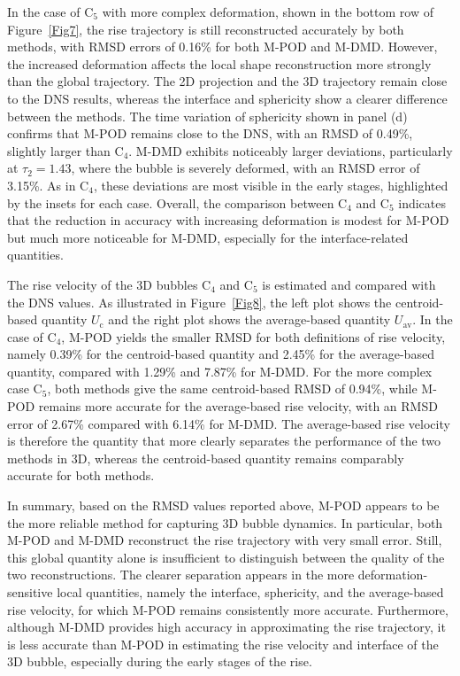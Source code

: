 \documentclass[a4paper,fleqn]{cas-sc}
\begin{document}
	In the case of C$_5$ with more complex deformation, shown in the bottom row of Figure~\ref{Fig7}, the rise trajectory is still reconstructed accurately by both methods, with RMSD errors of 0.16\% for both M-POD and M-DMD. However, the increased deformation affects the local shape reconstruction more strongly than the global trajectory. The 2D projection and the 3D trajectory remain close to the DNS results, whereas the interface and sphericity show a clearer difference between the methods. The time variation of sphericity shown in panel (d) confirms that M-POD remains close to the DNS, with an RMSD of 0.49\%, slightly larger than C$_4$. M-DMD exhibits noticeably larger deviations, particularly at $\tau_2=1.43$, where the bubble is severely deformed, with an RMSD error of 3.15\%. As in C$_4$, these deviations are most visible in the early stages, highlighted by the insets for each case. Overall, the comparison between C$_4$ and C$_5$ indicates that the reduction in accuracy with increasing deformation is modest for M-POD but much more noticeable for M-DMD, especially for the interface-related quantities.
	
	The rise velocity of the 3D bubbles C$_4$ and C$_5$ is estimated and compared with the DNS values. As illustrated in Figure~\ref{Fig8}, the left plot shows the centroid-based quantity $U_{\mathrm{c}}$ and the right plot shows the average-based quantity $U_{\mathrm{av}}$. In the case of C$_4$, M-POD yields the smaller RMSD for both definitions of rise velocity, namely 0.39\% for the centroid-based quantity and 2.45\% for the average-based quantity, compared with 1.29\% and 7.87\% for M-DMD. For the more complex case C$_5$, both methods give the same centroid-based RMSD of 0.94\%, while M-POD remains more accurate for the average-based rise velocity, with an RMSD error of 2.67\% compared with 6.14\% for M-DMD. The average-based rise velocity is therefore the quantity that more clearly separates the performance of the two methods in 3D, whereas the centroid-based quantity remains comparably accurate for both methods.
	
	In summary, based on the RMSD values reported above, M-POD appears to be the more reliable method for capturing 3D bubble dynamics. In particular, both M-POD and M-DMD reconstruct the rise trajectory with very small error. Still, this global quantity alone is insufficient to distinguish between the quality of the two reconstructions. The clearer separation appears in the more deformation-sensitive local quantities, namely the interface, sphericity, and the average-based rise velocity, for which M-POD remains consistently more accurate. Furthermore, although M-DMD provides high accuracy in approximating the rise trajectory, it is less accurate than M-POD in estimating the rise velocity and interface of the 3D bubble, especially during the early stages of the rise. 
		
\end{document}
